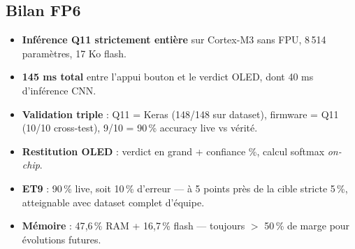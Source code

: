\subsection{Bilan FP6}

\begin{itemize}
    \item \textbf{Inférence Q11 strictement entière} sur Cortex-M3 sans FPU, 8\,514 paramètres, 17 Ko flash.
    \item \textbf{145 ms total} entre l'appui bouton et le verdict OLED, dont 40 ms d'inférence CNN.
    \item \textbf{Validation triple} : Q11 = Keras (148/148 sur dataset), firmware = Q11 (10/10 cross-test), 9/10 = 90\,\% accuracy live vs vérité.
    \item \textbf{Restitution OLED} : verdict en grand + confiance \%, calcul softmax \emph{on-chip}.
    \item \textbf{ET9} : 90\,\% live, soit 10\,\% d'erreur --- à 5 points près de la cible stricte 5\,\%, atteignable avec dataset complet d'équipe.
    \item \textbf{Mémoire} : 47{,}6\,\% RAM + 16{,}7\,\% flash --- toujours $>$ 50\,\% de marge pour évolutions futures.
\end{itemize}

\newpage
